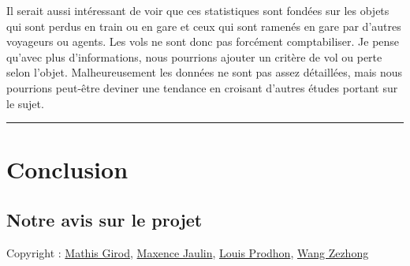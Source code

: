 \documentclass[
]{article}
\begin{document}
Il serait aussi intéressant de voir que ces statistiques sont fondées
sur les objets qui sont perdus en train ou en gare et ceux qui sont
ramenés en gare par d'autres voyageurs ou agents. Les vols ne sont donc
pas forcément comptabiliser. Je pense qu'avec plus d'informations, nous
pourrions ajouter un critère de vol ou perte selon l'objet.
Malheureusement les données ne sont pas assez détaillées, mais nous
pourrions peut-être deviner une tendance en croisant d'autres études
portant sur le sujet.

\begin{center}\rule{0.5\linewidth}{0.5pt}\end{center}

\hypertarget{conclusion}{%
\section{Conclusion}\label{conclusion}}

\hypertarget{notre-avis-sur-le-projet}{%
\subsection{Notre avis sur le projet}\label{notre-avis-sur-le-projet}}

Copyright : \href{https://github.com/girodmat}{Mathis Girod},
\href{https://github.com/maxencejaulin}{Maxence Jaulin},
\href{https://github.com/Grexiem}{Louis Prodhon},
\href{https://github.com/RubiesWzz}{Wang Zezhong}
\end{document}
